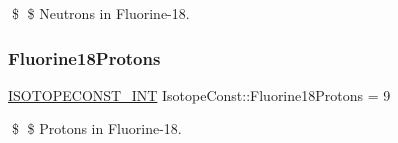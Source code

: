 \$ \$ Neutrons in Fluorine-\/18. \mbox{\label{group___isotope_const-_fluorine-_f18_ga873d120615b1c8858a5ec13a3f5d2007}} 
\subsubsection{\texorpdfstring{Fluorine18\+Protons}{Fluorine18Protons}}
{\footnotesize\ttfamily \mbox{\hyperlink{group___isotope_const-_macros_ga5f18360b3e99483a35c32d789e62621c}{I\+S\+O\+T\+O\+P\+E\+C\+O\+N\+S\+T\+\_\+\+I\+NT}} Isotope\+Const\+::\+Fluorine18\+Protons = 9}

\$ \$ Protons in Fluorine-\/18. 